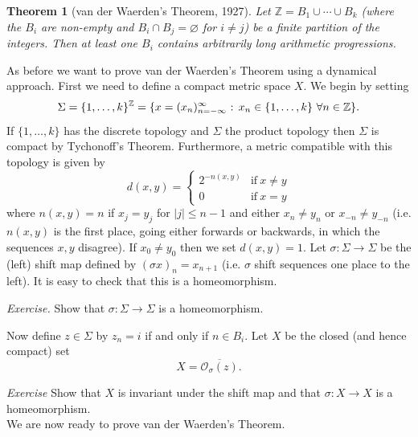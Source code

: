 \documentclass[12pt]{article}
\newtheorem{theorem}{Theorem}[section]
\theoremstyle{definition}
\theoremstyle{remark}
\begin{document}
\begin{theorem}[van der Waerden's Theorem, 1927] \label{vdwaerden_th}
Let $\mathbb Z = B_1 \cup \cdots \cup B_k$ (where the $B_i$ are non-empty and $B_i \cap B_j =\varnothing$ for $i \ne j$) be a finite partition of the integers.
Then at least one $B_i$ contains arbitrarily long arithmetic progressions.
\end{theorem}
As before we want to prove van der Waerden's Theorem using a dynamical approach. 
First we need to define a compact metric space $X$.
We begin by setting  
\[
\Sigma =\{1,\ldots,k\}^{\mathbb Z}
= \{x = (x_n)_{n=-\infty}^\infty \hbox{ : } x_n \in \{1,\ldots,k\} \ \forall n\in \mathbb Z\}.
\]
If $\{1,\ldots,k\}$ has the discrete topology and $\Sigma$ the product topology then $\Sigma$ is compact by Tychonoff's 
Theorem. Furthermore, a metric compatible with this topology is given by 
\[
d( x,y) =
\begin{cases} 
2^{-n(x,y)} & \text{if}\ x \not=y \\
 0 & \text{if} \ x=y
 \end{cases}
 \]
 where
$n(x,y) =n$ if $x_{j} = y_{j}$ for $|j| \leq n-1$ and either $x_{n} \not= y_{n}$ or $x_{-n} \not= y_{-n}$ 
(i.e. $n(x,y)$ is the first place, going either forwards or backwards, in which the sequences $x,y$ disagree).
If $x_0 \neq y_0$ then we set $d(x,y) =1$.
Let $\sigma : \Sigma \to \Sigma$ be the (left) shift map defined by
$(\sigma x)_n = x_{n+1}$ (i.e. $\sigma$ shift sequences one place to the left). It is easy to check that this is a homeomorphism.

\medskip
\noindent
{\it Exercise.}
Show that $\sigma : \Sigma \to \Sigma$ is a homeomorphism.

\medskip

Now define $z \in \Sigma$ by $z_n = i$ if and only if $n \in B_i$.
Let $X$ be the closed (and hence compact) set 
\[
X = \overline{\mathcal O_\sigma(z)}.
\]

\medskip
\noindent
{\it Exercise}
Show that $X$ is invariant under the shift map and that $\sigma : X \to X$ is a homeomorphism.\\

We are now ready to prove van der Waerden's Theorem.
\end{document}
